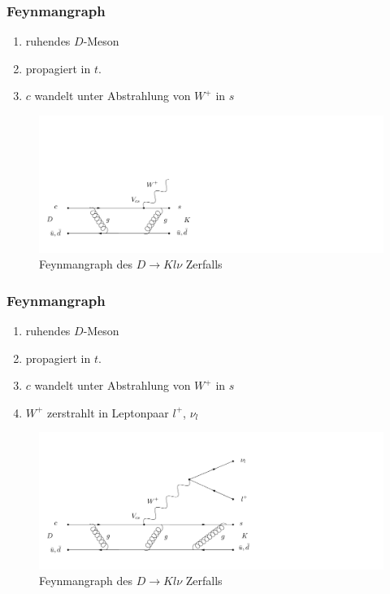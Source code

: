 \documentclass[hyperref={pdfpagelabels=false}]{beamer}
\begin{document}
\begin{frame}
 \frametitle{Feynmangraph}
 \setcounter{framenumber}{5}
\begin{minipage}[h]{0.38\textwidth}
 \begin{enumerate}
  \item ruhendes $D$-Meson
  \item propagiert in $t$.
  \item $c$ wandelt unter Abstrahlung von $W^+$ in $s$ 
 \end{enumerate}
\end{minipage}
\begin{minipage}[h]{0.58\textwidth}
  \begin{figure}[h]
  \includegraphics[width = 1.9\textwidth]{../Abbildungen/DFeyn3.png}
   \caption{Feynmangraph des $D\rightarrow Kl\nu$ Zerfalls}
 \end{figure}
\end{minipage}
\end{frame}

\begin{frame}
 \frametitle{Feynmangraph}
 \setcounter{framenumber}{5}
\begin{minipage}[h]{0.38\textwidth}
 \begin{enumerate}
  \item ruhendes $D$-Meson
  \item propagiert in $t$.
  \item $c$ wandelt unter Abstrahlung von $W^+$ in $s$
  \item $W^+$ zerstrahlt in Leptonpaar $l^+$, $\nu_l$
 \end{enumerate}
\end{minipage}
\begin{minipage}[h]{0.58\textwidth}
  \begin{figure}[h]
  \includegraphics[width = 1.9\textwidth]{../Abbildungen/DFeyn4.png}
   \caption{Feynmangraph des $D\rightarrow Kl\nu$ Zerfalls}
 \end{figure}
\end{minipage}
\end{frame}
\end{document}
